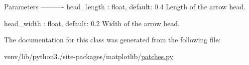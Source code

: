 \begin{DoxyVerb}Parameters
----------
head_length : float, default: 0.4
    Length of the arrow head.

head_width : float, default: 0.2
    Width of the arrow head.
\end{DoxyVerb}
 

The documentation for this class was generated from the following file\+:\begin{DoxyCompactItemize}
\item 
venv/lib/python3./site-\/packages/matplotlib/\hyperlink{patches_8py}{patches.\+py}\end{DoxyCompactItemize}
